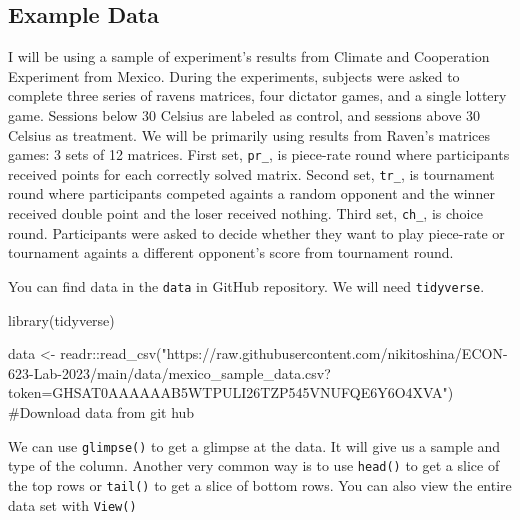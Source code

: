 \documentclass[
  letterpaper,
]{book}
\newenvironment{Shaded}{\begin{snugshade}}{\end{snugshade}}
\newcommand{\CommentTok}[1]{\textcolor[rgb]{0.37,0.37,0.37}{#1}}
\newcommand{\FunctionTok}[1]{\textcolor[rgb]{0.28,0.35,0.67}{#1}}
\newcommand{\NormalTok}[1]{\textcolor[rgb]{0.00,0.23,0.31}{#1}}
\newcommand{\OtherTok}[1]{\textcolor[rgb]{0.00,0.23,0.31}{#1}}
\newcommand{\SpecialCharTok}[1]{\textcolor[rgb]{0.37,0.37,0.37}{#1}}
\newcommand{\StringTok}[1]{\textcolor[rgb]{0.13,0.47,0.30}{#1}}
\begin{document}
\hypertarget{example-data}{%
\subsection{Example Data}\label{example-data}}

I will be using a sample of experiment's results from Climate and
Cooperation Experiment from Mexico. During the experiments, subjects
were asked to complete three series of ravens matrices, four dictator
games, and a single lottery game. Sessions below 30 Celsius are labeled
as control, and sessions above 30 Celsius as treatment. We will be
primarily using results from Raven's matrices games: 3 sets of 12
matrices. First set, \texttt{pr\_}, is piece-rate round where
participants received points for each correctly solved matrix. Second
set, \texttt{tr\_}, is tournament round where participants competed
againts a random opponent and the winner received double point and the
loser received nothing. Third set, \texttt{ch\_}, is choice round.
Participants were asked to decide whether they want to play piece-rate
or tournament againts a different opponent's score from tournament
round.

You can find data in the \texttt{data} in GitHub repository. We will
need \texttt{tidyverse}.

\begin{Shaded}
\begin{Highlighting}[]
\FunctionTok{library}\NormalTok{(tidyverse)}
\end{Highlighting}
\end{Shaded}

\begin{Shaded}
\begin{Highlighting}[]
\NormalTok{data }\OtherTok{\textless{}{-}}\NormalTok{ readr}\SpecialCharTok{::}\FunctionTok{read\_csv}\NormalTok{(}\StringTok{"https://raw.githubusercontent.com/nikitoshina/ECON{-}623{-}Lab{-}2023/main/data/mexico\_sample\_data.csv?token=GHSAT0AAAAAAB5WTPULI26TZP545VNUFQE6Y6O4XVA"}\NormalTok{) }\CommentTok{\#Download data from git hub}
\end{Highlighting}
\end{Shaded}

We can use \texttt{glimpse()} to get a glimpse at the data. It will give
us a sample and type of the column. Another very common way is to use
\texttt{head()} to get a slice of the top rows or \texttt{tail()} to get
a slice of bottom rows. You can also view the entire data set with
\texttt{View()}
\end{document}
